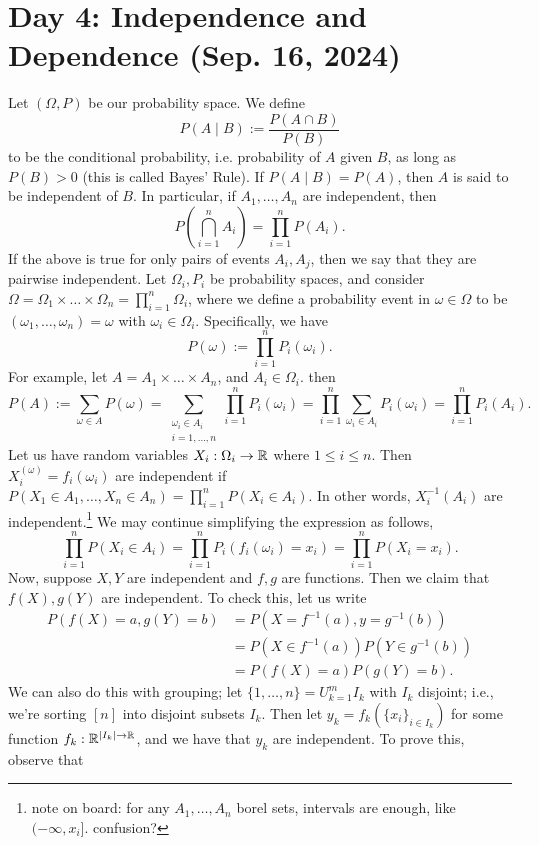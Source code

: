 \section{Day 4: Independence and Dependence (Sep. 16, 2024)}
Let $(\Omega, P)$ be our probability space. We define
\[ P (A \mid B) := \frac{P(A \cap B)}{P(B)} \]
to be the conditional probability, i.e. probability of $A$ given $B$, as long as $P(B) > 0$ (this is called Bayes' Rule). If $P(A \mid B) = P(A)$, then $A$ is said to be independent of $B$. In particular, if $A_1, \dots, A_n$ are independent, then
\[ P\left(\bigcap_{i = 1}^n A_i \right) = \prod_{i=1}^n P(A_i). \]
If the above is true for only pairs of events $A_i, A_j$, then we say that they are pairwise independent.
\medskip\newline
\noindent Let $\Omega_i, P_i$ be probability spaces, and consider $\Omega = \Omega_1 \times \dots \times \Omega_n = \prod_{i=1}^n \Omega_i$, where we define a probability event in $\omega \in \Omega$ to be $(\omega_1, \dots, \omega_n) = \omega$ with $\omega_i \in \Omega_i$. Specifically, we have
\[ P(\omega) := \prod_{i=1}^n P_i(\omega_i). \]
For example, let $A = A_1 \times \dots \times A_n$, and $A_i \in \Omega_i$. then
\[ P(A) := \sum_{\omega \in A} P(\omega) = \sum_{\substack{\omega_i \in A_i \\ i = 1, \dots, n}} \prod_{i=1}^n P_i(\omega_i) = \prod_{i=1}^n \sum_{\omega_i \in A_i} P_i(\omega_i) = \prod_{i=1}^n P_i(A_i). \]
Let us have random variables $X_i : \Omega_i \to \mathbb R$ where $1 \leq i \leq n$. Then $X_i^(\omega) = f_i(\omega_i)$ are independent if $P(X_1 \in A_1, \dots, X_n \in A_n) = \prod_{i=1}^n P(X_i \in A_i)$. In other words, $X_i^{-1}(A_i)$ are independent.\footnote{note on board: for any $A_1, \dots, A_n$ borel sets, intervals are enough, like $(-\infty, x_i]$. confusion?} We may continue simplifying the expression as follows,
\[ \prod_{i=1}^n P(X_i \in A_i) = \prod_{i=1}^n P_i(f_i(\omega_i) = x_i) = \prod_{i=1}^n P(X_i = x_i). \]
Now, suppose $X, Y$ are independent and $f, g$ are functions. Then we claim that $f(X), g(Y)$ are independent. To check this, let us write
\begin{align*}
    P(f(X) = a, g(Y) = b) &= P(X = f^{-1}(a), y = g^{-1}(b)) \\
    &= P(X \in f^{-1}(a)) P(Y \in g^{-1}(b)) \\
    &= P(f(X) = a) P(g(Y) = b).
\end{align*}
We can also do this with grouping; let $\{1, \dots, n\} = U_{k=1}^m I_k$ with $I_k$ disjoint; i.e., we're sorting $[n]$ into disjoint subsets $I_k$. Then let $y_k = f_k(\{x_i\}_{i \in I_k})$ for some function $f_k : \mathbb R^{\left\lvert I_k \right\rvert \to \mathbb R}$, and we have that $y_k$ are independent. To prove this, observe that
